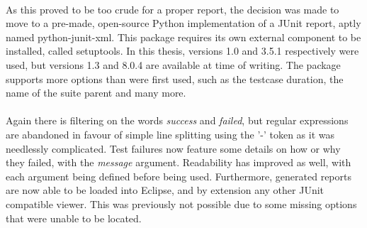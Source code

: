 \documentclass[11pt,british]{article}
\begin{document}
\\
As this proved to be too crude for a proper report, the decision was made to move to a pre-made, open-source Python implementation of a JUnit report, aptly named python-junit-xml.\cite{junitxml} This package requires its own external component to be installed, called setuptools.\cite{setuptools} In this thesis, versions 1.0 and 3.5.1 respectively were used, but versions 1.3 and 8.0.4 are available at time of writing. The package supports more options than were first used, such as the testcase duration, the name of the suite parent and many more.\\
\\
Again there is filtering on the words \emph{success} and \emph{failed}, but regular expressions are abandoned in favour of simple line splitting using the '-' token as it was needlessly complicated. Test failures now feature some details on how or why they failed, with the \emph{message} argument. Readability has improved as well, with each argument being defined before being used. Furthermore, generated reports are now able to be loaded into Eclipse, and by extension any other JUnit compatible viewer. This was previously not possible due to some missing options that were unable to be located.
\end{document}
